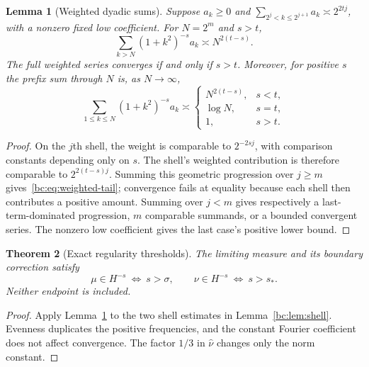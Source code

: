 \documentclass[11pt,a4paper,oneside,openany]{book}
\numberwithin{equation}{chapter}
\newtheorem{theorem}{Theorem}[chapter]
\newtheorem{lemma}[theorem]{Lemma}
\theoremstyle{definition}
\theoremstyle{remark}
\begin{document}
\begin{lemma}[Weighted dyadic sums]
\label{bc:lem:weighted}
Suppose $a_k\ge0$ and
$\sum_{2^j<k\le2^{j+1}}a_k\asymp2^{2tj}$, with a nonzero fixed low coefficient.
For $N=2^m$ and $s>t$,
\begin{equation}
 \sum_{k>N}(1+k^2)^{-s}a_k\asymp N^{2(t-s)}.
 \label{bc:eq:weighted-tail}
\end{equation}
The full weighted series converges if and only if $s>t$. Moreover, for positive
$s$ the prefix sum through $N$ is, as $N\to\infty$,
\begin{equation}
 \sum_{1\le k\le N}(1+k^2)^{-s}a_k\asymp
 \begin{cases}
 N^{2(t-s)},&s<t,\\
 \log N,&s=t,\\
 1,&s>t.
 \end{cases}
 \label{bc:eq:weighted-prefix}
\end{equation}
\end{lemma}
\begin{proof}
On the $j$th shell, the weight is comparable to $2^{-2sj}$, with comparison
constants depending only on $s$. The shell's weighted contribution is therefore
comparable to $2^{2(t-s)j}$. Summing this geometric progression over $j\ge m$
gives~\eqref{bc:eq:weighted-tail}; convergence fails at equality because each shell
then contributes a positive amount. Summing over $j<m$ gives respectively a
last-term-dominated progression, $m$ comparable summands, or a bounded convergent
series. The nonzero low coefficient gives the last case's positive lower bound.
\end{proof}

\begin{theorem}[Exact regularity thresholds]
\label{bc:thm:regularity}
The limiting measure and its boundary correction satisfy
\begin{equation}
 \mu\in H^{-s}\ \Longleftrightarrow\ s>\sigma,
 \qquad
 \nu\in H^{-s}\ \Longleftrightarrow\ s>s_*.
 \label{bc:eq:regularity}
\end{equation}
Neither endpoint is included.
\end{theorem}
\begin{proof}
Apply Lemma~\ref{bc:lem:weighted} to the two shell estimates in
Lemma~\ref{bc:lem:shell}. Evenness duplicates the positive frequencies, and the
constant Fourier coefficient does not affect convergence. The factor $1/3$
in $\widehat\nu$ changes only the norm constant.
\end{proof}
\end{document}
